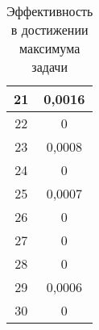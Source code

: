 \begin{table}[ht!]
\begin{tabular}{|c|c|}
		21      & 0,0016                                 \\ \hline
		22      & 0                                      \\ \hline
		23      & 0,0008                                 \\ \hline
		24      & 0                                      \\ \hline
		25      & 0,0007                                 \\ \hline
		26      & 0                                      \\ \hline
		27      & 0                                      \\ \hline
		28      & 0                                      \\ \hline
		29      & 0,0006                                 \\ \hline
		30      & 0                                      \\ \hline
	\end{tabular}
	\caption{Эффективность в достижении максимума задачи}
	\label{BigResults2}
\end{table}
\FloatBarrier
